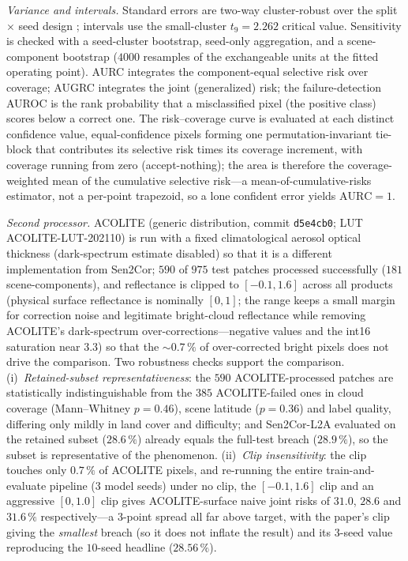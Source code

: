 \documentclass[preprint,3p,times]{elsarticle}
\begin{document}
\emph{Variance and intervals.} Standard errors are two-way cluster-robust over the split $\times$ seed design \citep{cameron2011}; intervals use the small-cluster $t_9 = 2.262$ critical value. Sensitivity is checked with a seed-cluster bootstrap, seed-only aggregation, and a scene-component bootstrap ($4000$ resamples of the exchangeable units at the fitted operating point). AURC integrates the component-equal selective risk over coverage; AUGRC integrates the joint (generalized) risk; the failure-detection AUROC is the rank probability that a misclassified pixel (the positive class) scores below a correct one. The risk--coverage curve is evaluated at each distinct confidence value, equal-confidence pixels forming one permutation-invariant tie-block that contributes its selective risk times its coverage increment, with coverage running from zero (accept-nothing); the area is therefore the coverage-weighted mean of the cumulative selective risk---a mean-of-cumulative-risks estimator, not a per-point trapezoid, so a lone confident error yields $\mathrm{AURC}=1$.

\emph{Second processor.} ACOLITE (generic distribution, commit \texttt{d5e4cb0}; LUT ACOLITE-LUT-202110) is run with a fixed climatological aerosol optical thickness (dark-spectrum estimate disabled) so that it is a different implementation from Sen2Cor; $590$ of $975$ test patches processed successfully ($181$ scene-components), and reflectance is clipped to $[-0.1, 1.6]$ across all products (physical surface reflectance is nominally $[0,1]$; the range keeps a small margin for correction noise and legitimate bright-cloud reflectance while removing ACOLITE's dark-spectrum over-corrections---negative values and the int16 saturation near $3.3$) so that the ${\sim}0.7\,\%$ of over-corrected bright pixels does not drive the comparison. Two robustness checks support the comparison. (i)~\emph{Retained-subset representativeness}: the $590$ ACOLITE-processed patches are statistically indistinguishable from the $385$ ACOLITE-failed ones in cloud coverage (Mann--Whitney $p=0.46$), scene latitude ($p=0.36$) and label quality, differing only mildly in land cover and difficulty; and Sen2Cor-L2A evaluated on the retained subset ($28.6\,\%$) already equals the full-test breach ($28.9\,\%$), so the subset is representative of the phenomenon. (ii)~\emph{Clip insensitivity}: the clip touches only $0.7\,\%$ of ACOLITE pixels, and re-running the entire train-and-evaluate pipeline ($3$ model seeds) under no clip, the $[-0.1,1.6]$ clip and an aggressive $[0,1.0]$ clip gives ACOLITE-surface naive joint risks of $31.0$, $28.6$ and $31.6\,\%$ respectively---a $3$-point spread all far above target, with the paper's clip giving the \emph{smallest} breach (so it does not inflate the result) and its $3$-seed value reproducing the $10$-seed headline ($28.56\,\%$).
\end{document}
